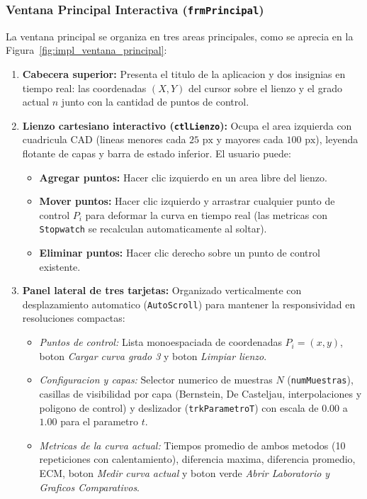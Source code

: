 \subsubsection{Ventana Principal Interactiva (\texttt{frmPrincipal})}
\label{subsubsec:impl_ventana_principal}

La ventana principal se organiza en tres areas principales, como se aprecia en la Figura~\ref{fig:impl_ventana_principal}:

\begin{enumerate}
    \item \textbf{Cabecera superior:} Presenta el titulo de la aplicacion y dos insignias en tiempo real: las coordenadas $(X, Y)$ del cursor sobre el lienzo y el grado actual $n$ junto con la cantidad de puntos de control.
    \item \textbf{Lienzo cartesiano interactivo (\texttt{ctlLienzo}):} Ocupa el area izquierda con cuadricula CAD (lineas menores cada $25\text{ px}$ y mayores cada $100\text{ px}$), leyenda flotante de capas y barra de estado inferior. El usuario puede:
    \begin{itemize}
        \item \textbf{Agregar puntos:} Hacer clic izquierdo en un area libre del lienzo.
        \item \textbf{Mover puntos:} Hacer clic izquierdo y arrastrar cualquier punto de control $P_i$ para deformar la curva en tiempo real (las metricas con \texttt{Stopwatch} se recalculan automaticamente al soltar).
        \item \textbf{Eliminar puntos:} Hacer clic derecho sobre un punto de control existente.
    \end{itemize}
    \item \textbf{Panel lateral de tres tarjetas:} Organizado verticalmente con desplazamiento automatico (\texttt{AutoScroll}) para mantener la responsividad en resoluciones compactas:
    \begin{itemize}
        \item \textit{Puntos de control:} Lista monoespaciada de coordenadas $P_i = (x, y)$, boton \textit{Cargar curva grado 3} y boton \textit{Limpiar lienzo}.
        \item \textit{Configuracion y capas:} Selector numerico de muestras $N$ (\texttt{numMuestras}), casillas de visibilidad por capa (Bernstein, De Casteljau, interpolaciones y poligono de control) y deslizador (\texttt{trkParametroT}) con escala de $0.00$ a $1.00$ para el parametro $t$.
        \item \textit{Metricas de la curva actual:} Tiempos promedio de ambos metodos (10 repeticiones con calentamiento), diferencia maxima, diferencia promedio, ECM, boton \textit{Medir curva actual} y boton verde \textit{Abrir Laboratorio y Graficos Comparativos}.
    \end{itemize}
\end{enumerate}

